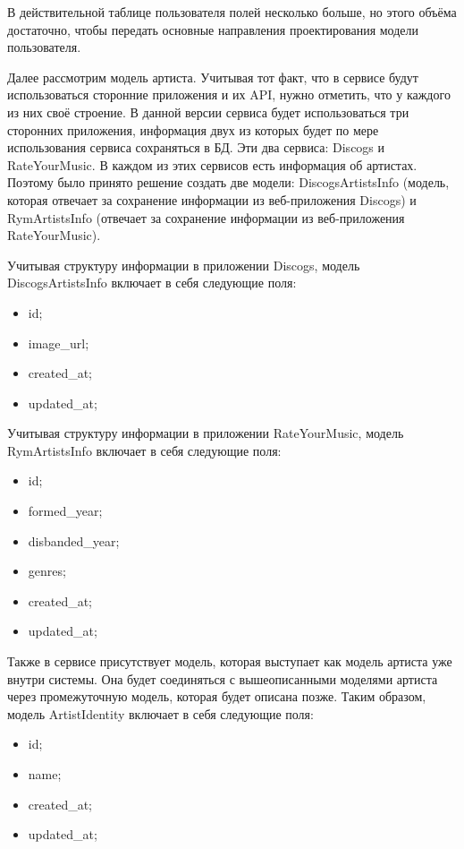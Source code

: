 В действительной таблице пользователя полей несколько больше, но этого объёма достаточно, чтобы передать основные направления проектирования модели пользователя.

Далее рассмотрим модель артиста. Учитывая тот факт, что в сервисе будут использоваться сторонние приложения и их API, нужно отметить, что у каждого из них своё строение. В данной версии сервиса будет использоваться три сторонних приложения, информация двух из которых будет по мере использования сервиса сохраняться в БД. Эти два сервиса: Discogs и RateYourMusic. В каждом из этих сервисов есть информация об артистах. Поэтому было принято решение создать две модели: DiscogsArtistsInfo (модель, которая отвечает за сохранение информации из веб-приложения Discogs) и RymArtistsInfo (отвечает за сохранение информации из веб-приложения RateYourMusic).

Учитывая структуру информации в приложении Discogs, модель DiscogsArtistsInfo включает в себя следующие поля:

\begin{itemize}
  \item id;
  \item image\_url;
  \item created\_at;
  \item updated\_at;
\end{itemize}

Учитывая структуру информации в приложении RateYourMusic, модель RymArtistsInfo включает в себя следующие поля:

\begin{itemize}
  \item id;
  \item formed\_year;
  \item disbanded\_year;
  \item genres;
  \item created\_at;
  \item updated\_at;
\end{itemize}

Также в сервисе присутствует модель, которая выступает как модель артиста уже внутри системы. Она будет соединяться с вышеописанными моделями артиста через промежуточную модель, которая будет описана позже. Таким образом, модель ArtistIdentity включает в себя следующие поля:

\begin{itemize}
  \item id;
  \item name;
  \item created\_at;
  \item updated\_at;
\end{itemize}

